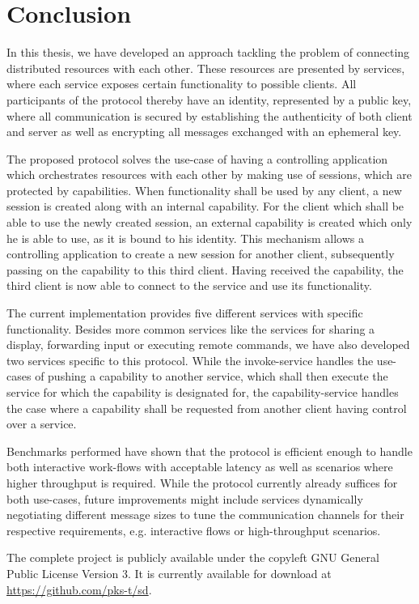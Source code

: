 \chapter{Conclusion}

In this thesis, we have developed an approach tackling the problem of connecting distributed resources with each other.
These resources are presented by services, where each service exposes certain functionality to possible clients.
All participants of the protocol thereby have an identity, represented by a public key, where all communication is secured by establishing the authenticity of both client and server as well as encrypting all messages exchanged with an ephemeral key.

The proposed protocol solves the use-case of having a controlling application which orchestrates resources with each other by making use of sessions, which are protected by capabilities.
When functionality shall be used by any client, a new session is created along with an internal capability.
For the client which shall be able to use the newly created session, an external capability is created which only he is able to use, as it is bound to his identity.
This mechanism allows a controlling application to create a new session for another client, subsequently passing on the capability to this third client.
Having received the capability, the third client is now able to connect to the service and use its functionality.

The current implementation provides five different services with specific functionality.
Besides more common services like the services for sharing a display, forwarding input or executing remote commands, we have also developed two services specific to this protocol.
While the invoke-service handles the use-cases of pushing a capability to another service, which shall then execute the service for which the capability is designated for, the capability-service handles the case where a capability shall be requested from another client having control over a service.

Benchmarks performed have shown that the protocol is efficient enough to handle both interactive work-flows with acceptable latency as well as scenarios where higher throughput is required.
While the protocol currently already suffices for both use-cases, future improvements might include services dynamically negotiating different message sizes to tune the communication channels for their respective requirements, e.g. interactive flows or high-throughput scenarios.

The complete project is publicly available under the copyleft GNU General Public License Version 3.
It is currently available for download at \url{https://github.com/pks-t/sd}.

